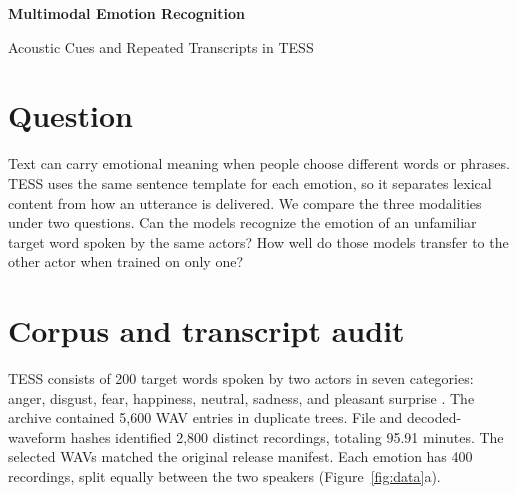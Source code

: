 \documentclass[11pt,a4paper]{article}
\newcommand{\reportauthor}{}
\begin{document}
{\LARGE\bfseries Multimodal Emotion Recognition\par}
\vspace{2pt}
{\large Acoustic Cues and Repeated Transcripts in TESS\par}
\ifx\reportauthor\empty\else\medskip\reportauthor\par\fi
\medskip

\begin{abstract}
We compared speech, text, and feature-level fusion on 2,800 recordings from the Toronto Emotional Speech Set (TESS). Each carrier sentence occurs equally often across seven emotions. Text-only accuracy reached its empirical ceiling of 14.29\%. On held-out words, a bidirectional GRU reached 99.84\% accuracy and fusion reached 99.76\%, averaged over three optimization seeds. Speech accuracy fell to 42.26\% and 37.10\% when holding out each of the two speakers in turn. Fusion also trailed speech on both holdouts. Permuting text embeddings had little effect, while zeroing speech reduced fusion to 14.29\% in all three protocols. Fusion embeddings formed tighter emotion clusters on the word-disjoint test set, yet yielded no consistent accuracy gain. The results describe acted speech from two speakers and show why word-disjoint evaluation alone can overstate transfer to an unseen speaker.
\end{abstract}

\section{Question}
Text can carry emotional meaning when people choose different words or phrases. TESS uses the same sentence template for each emotion, so it separates lexical content from how an utterance is delivered. We compare the three modalities under two questions. Can the models recognize the emotion of an unfamiliar target word spoken by the same actors? How well do those models transfer to the other actor when trained on only one?

\section{Corpus and transcript audit}
TESS consists of 200 target words spoken by two actors in seven categories: anger, disgust, fear, happiness, neutral, sadness, and pleasant surprise \cite{tess}. The archive contained 5,600 WAV entries in duplicate trees. File and decoded-waveform hashes identified 2,800 distinct recordings, totaling 95.91 minutes. The selected WAVs matched the original release manifest. Each emotion has 400 recordings, split equally between the two speakers (Figure~\ref{fig:data}a).
\end{document}
